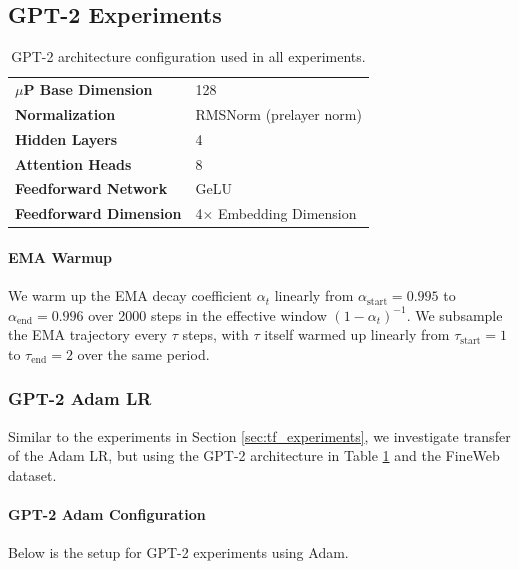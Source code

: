\newpage
\subsection{GPT-2 Experiments}\label{app:gpt}


\begin{table}[ht]
\centering
\small
\renewcommand{\arraystretch}{1.2}
\begin{tabular}{@{}ll@{}}
\toprule
\textbf{$\mu$P Base Dimension} & 128 \\
\addlinespace
\textbf{Normalization} & RMSNorm (prelayer norm) \\
\addlinespace
\textbf{Hidden Layers} & 4 \\
\addlinespace
\textbf{Attention Heads} & 8 \\
\addlinespace
\textbf{Feedforward Network} & GeLU\\
\addlinespace
\textbf{Feedforward Dimension} & 4$\times$ Embedding Dimension\\
\bottomrule
\end{tabular}
\caption{GPT-2 architecture configuration used in all experiments.}
\label{tab:gpt2}
\end{table}

\paragraph{EMA Warmup}  
We warm up the EMA decay coefficient \(\alpha_t\) linearly from \(\alpha_{\mathrm{start}}=0.995\) to \(\alpha_{\mathrm{end}}=0.996\) over 2000 steps in the effective window \((1-\alpha_t)^{-1}\). We subsample the EMA trajectory every \(\tau\) steps, with \(\tau\) itself warmed up linearly from \(\tau_{\mathrm{start}}=1\) to \(\tau_{\mathrm{end}}=2\) over the same period.

\subsubsection{GPT-2 Adam LR}\label{app:gpt_adam_lr}
Similar to the experiments in Section \ref{sec:tf_experiments}, we investigate transfer of the Adam LR, but using the GPT-2 architecture in Table \ref{tab:gpt2} and the FineWeb dataset.
\paragraph{GPT-2 Adam Configuration}
Below is the setup for GPT-2 experiments using Adam.  

